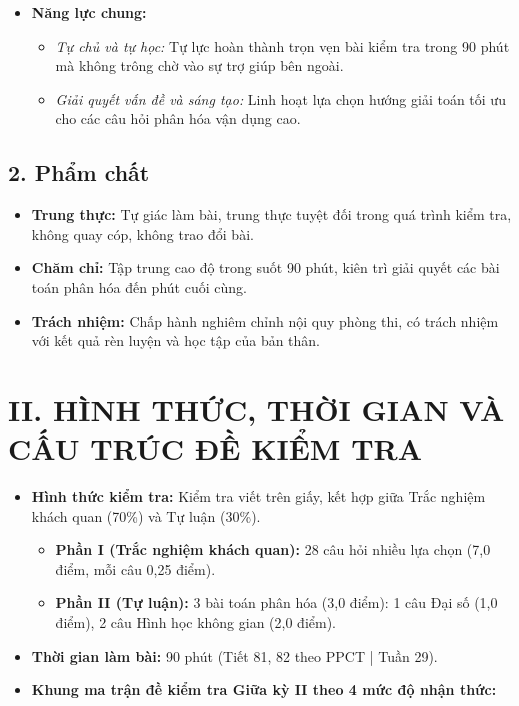 \documentclass[12pt, a4paper]{article}
\begin{document}
\begin{itemize}[leftmargin=1.2cm]
    \item \textbf{Năng lực chung:}
    \begin{itemize}[leftmargin=0.6cm]
        \item \textit{Tự chủ và tự học:} Tự lực hoàn thành trọn vẹn bài kiểm tra trong 90 phút mà không trông chờ vào sự trợ giúp bên ngoài.
        \item \textit{Giải quyết vấn đề và sáng tạo:} Linh hoạt lựa chọn hướng giải toán tối ưu cho các câu hỏi phân hóa vận dụng cao.
    \end{itemize}
\end{itemize}

\subsection*{2. Phẩm chất}

\begin{itemize}[leftmargin=1.2cm]
    \item \textbf{Trung thực:} Tự giác làm bài, trung thực tuyệt đối trong quá trình kiểm tra, không quay cóp, không trao đổi bài.
    \item \textbf{Chăm chỉ:} Tập trung cao độ trong suốt 90 phút, kiên trì giải quyết các bài toán phân hóa đến phút cuối cùng.
    \item \textbf{Trách nhiệm:} Chấp hành nghiêm chỉnh nội quy phòng thi, có trách nhiệm với kết quả rèn luyện và học tập của bản thân.
\end{itemize}

\section*{II. HÌNH THỨC, THỜI GIAN VÀ CẤU TRÚC ĐỀ KIỂM TRA}

\begin{itemize}[leftmargin=1.2cm]
    \item \textbf{Hình thức kiểm tra:} Kiểm tra viết trên giấy, kết hợp giữa Trắc nghiệm khách quan (70\%) và Tự luận (30\%).
    \begin{itemize}[leftmargin=0.6cm]
        \item \textbf{Phần I (Trắc nghiệm khách quan):} 28 câu hỏi nhiều lựa chọn (7,0 điểm, mỗi câu 0,25 điểm).
        \item \textbf{Phần II (Tự luận):} 3 bài toán phân hóa (3,0 điểm): 1 câu Đại số (1,0 điểm), 2 câu Hình học không gian (2,0 điểm).
    \end{itemize}
    \item \textbf{Thời gian làm bài:} 90 phút (Tiết 81, 82 theo PPCT | Tuần 29).
    \item \textbf{Khung ma trận đề kiểm tra Giữa kỳ II theo 4 mức độ nhận thức:}
\end{itemize}
\end{document}
